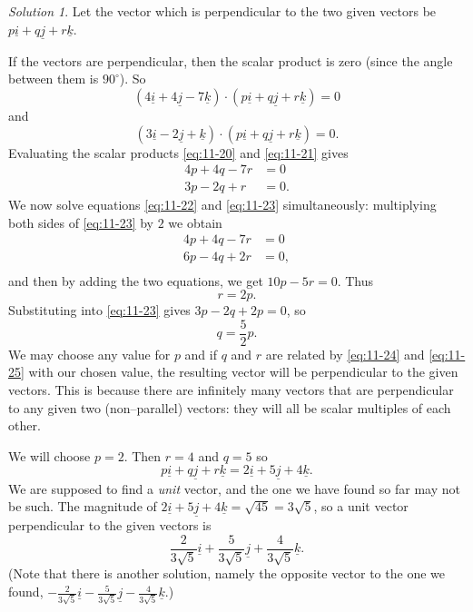\documentclass[
  english,
  11pt,
  oneside]{book}
\theoremstyle{definition}
\theoremstyle{definition}
\theoremstyle{definition}
\theoremstyle{definition}
\theoremstyle{remark}
\newtheorem*{solution}{Solution}
\begin{document}
\begin{solution}
Let the vector which is perpendicular to the two given vectors be \(p\underline i + q\underline j + r\underline k\).

If the vectors are perpendicular, then the scalar product is zero (since the angle between them is \(90^\circ\)). So
\begin{equation}
(4\underline i + 4\underline j - 7\underline k) \cdot (p\underline i + q\underline j + r\underline k) = 0
\label{eq:11-20}
\end{equation}
and
\begin{equation}
(3\underline i - 2\underline j + \underline k) \cdot (p\underline i + q\underline j + r\underline k) = 0.
\label{eq:11-21}
\end{equation}
Evaluating the scalar products \eqref{eq:11-20} and \eqref{eq:11-21} gives
\begin{align}
4p + 4q -7r& = 0
\label{eq:11-22}\\
3p - 2q + r& = 0.
\label{eq:11-23}
\end{align}
We now solve equations \eqref{eq:11-22} and \eqref{eq:11-23} simultaneously: multiplying both sides of \eqref{eq:11-23} by \(2\) we obtain
\begin{align*}
4p + 4q - 7r& = 0\\
6p - 4q + 2r& = 0,\\
\end{align*}
and then by adding the two equations, we get \(10p - 5r = 0\). Thus
\begin{equation}
r = 2p.
\label{eq:11-24}
\end{equation}
Substituting into \eqref{eq:11-23} gives \(3p - 2q + 2p = 0\), so
\begin{equation}
q = \frac52p.
\label{eq:11-25}
\end{equation}
We may choose any value for \(p\) and if \(q\) and \(r\) are related by \eqref{eq:11-24} and \eqref{eq:11-25} with our chosen value, the resulting vector will be perpendicular to the given vectors. This is because there are infinitely many vectors that are perpendicular to any given two (non--parallel) vectors: they will all be scalar multiples of each other.

We will choose \(p = 2\). Then \(r= 4\) and \(q = 5\) so
\[
p\underline i + q\underline j + r\underline k = 2\underline i + 5\underline j + 4\underline k.
\]
We are supposed to find a \emph{unit} vector, and the one we have found so far may not be such. The magnitude of \(2\underline i + 5\underline j + 4\underline k = \sqrt{45} = 3\sqrt{5}\), so a unit vector perpendicular to the given vectors is
\[
\frac{2}{3\sqrt{5}}\underline i+\frac{5}{3\sqrt{5}}\underline j+\frac{4}{3\sqrt{5}}\underline k.
\]
(Note that there is another solution, namely the opposite vector to the one we found,
\(-\frac{2}{3\sqrt{5}}\underline i-\frac{5}{3\sqrt{5}}\underline j-\frac{4}{3\sqrt{5}}\underline k\).)
\end{solution}
\end{document}
